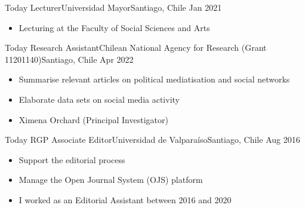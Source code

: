 






\begin{experiences}
  \emptySeparator 
  \experience 
    {Today} {Lecturer}{Universidad Mayor}{Santiago, Chile} {Jan 2021}
    {\begin{itemize}
    \item Lecturing at the Faculty of Social Sciences and Arts
    \end{itemize}}
    {}
\end{experiences}
\vspace{-2mm}

\begin{experiences}
  \emptySeparator 
  \experience 
    {Today} {Research Assistant}{Chilean National Agency for Research (Grant 11201140)}{Santiago, Chile} {Apr 2022}
    {\begin{itemize}
    \item Summarise relevant articles on political mediatisation and social networks
    \item Elaborate data sets on social media activity
    \item Ximena Orchard {\small (Principal Investigator)}
    \end{itemize}}
    {}
\end{experiences}
\vspace{-2mm}

\begin{experiences}
  \experience
    {Today} {RGP Associate Editor}{Universidad de Valparaíso}{Santiago, Chile} {Aug 2016}
    {\begin{itemize}
    \item Support the editorial process
    \item Manage the Open Journal System (OJS) platform 
    \item I worked as an Editorial Assistant between 2016 and 2020
    \end{itemize}}
    {}
\end{experiences}
\vspace{-2mm}

